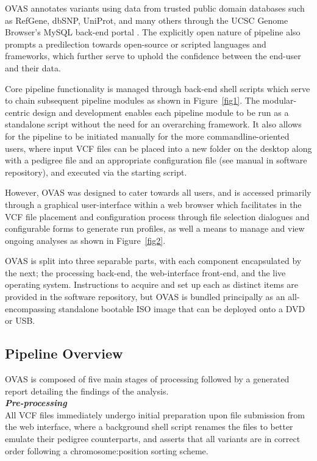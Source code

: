 \documentclass[twocolumn]{bmcart}%
\def\app{OVAS}
\newcommand{\triplesub}[2]{\noindent\textsl{#1}\\#2\\}  %
\begin{document}
\app{} annotates variants using data from trusted public domain databases such as RefGene, dbSNP, UniProt, and many others through the UCSC Genome Browser's MySQL back-end portal \cite{karolchik2003ucsc}. The explicitly open nature of pipeline also prompts a predilection towards open-source or scripted languages and frameworks, which further serve to uphold the confidence between the end-user and their data.

Core pipeline functionality is managed through back-end shell scripts which serve to chain subsequent pipeline modules as shown in Figure~\ref{fig1}. The modular-centric design and development enables each pipeline module to be run as a standalone script without the need for an overarching framework. It also allows for the pipeline to be initiated manually for the more commandline-oriented users, where input VCF files can be placed into a new folder on the desktop along with a pedigree file and an appropriate configuration file (see manual in software repository), and executed via the starting script. 

However, \app{} was designed to cater towards all users, and is accessed primarily through a graphical user-interface within a web browser which facilitates in the VCF file placement and configuration process through file selection dialogues and configurable forms to generate run profiles, as well a means to manage and view ongoing analyses as shown in Figure~\ref{fig2}.

\app{} is split into three separable parts, with each component encapsulated by the next; the processing back-end, the web-interface front-end, and the live operating system. Instructions to acquire and set up each as distinct items are provided in the software repository, but \app{} is bundled principally as an all-encompassing standalone bootable ISO image that can be deployed onto a DVD or USB.


\subsection{Pipeline Overview}

\app{} is composed of five main stages of processing followed by a generated report detailing the findings of the analysis.\\

\triplesub{\bf Pre-processing}{All VCF files immediately undergo initial preparation upon file submission from the web interface, where a background shell script renames the files to better emulate their pedigree counterparts, and asserts that all variants are in correct order following a chromosome:position sorting scheme.}
\end{document}
